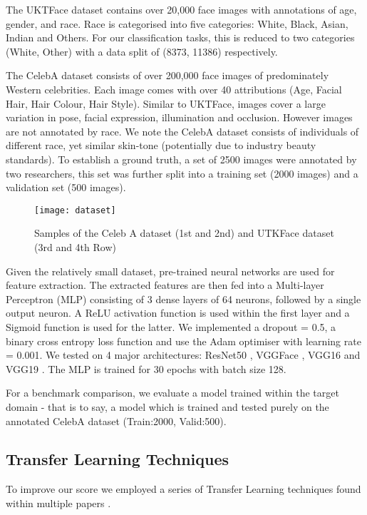 \documentclass[10pt,twocolumn,letterpaper]{article}
\begin{document}
The UKTFace dataset contains over 20,000 face images with annotations of age, gender, and race. Race is categorised into five categories: White, Black, Asian, Indian and Others. For our classification tasks, this is reduced to two categories (White, Other) with a data split of (8373, 11386) respectively. 

The CelebA dataset consists of over 200,000 face images of predominately Western celebrities. Each image comes with over 40 attributions (Age, Facial Hair, Hair Colour, Hair Style). Similar to UKTFace, images cover a large variation in pose, facial expression, illumination and occlusion. However images are not annotated by race. We note the CelebA dataset consists of individuals of different race, yet similar skin-tone (potentially due to industry beauty standards). To establish a ground truth, a set of 2500 images were annotated by two researchers, this set was further split into a training set (2000 images) and a validation set (500 images). 

\begin{figure}[h!]
\label{fig:long}
\begin{center}
   \texttt{[image: dataset]}
\end{center}
   \caption{\label{Fig: Datasets}Samples of the Celeb A dataset (1st and 2nd) and UTKFace dataset (3rd and 4th Row)}


\end{figure}

Given the relatively small dataset, pre-trained neural networks are used for feature extraction. The extracted features are then fed into a Multi-layer Perceptron (MLP) consisting of 3 dense layers of 64 neurons, followed by a single output neuron. A ReLU activation function is used within the first layer and a Sigmoid function is used for the latter. We implemented a dropout = 0.5, a binary cross entropy loss function and use the Adam optimiser with learning rate = 0.001. We tested on 4 major architectures: ResNet50 \cite{He2015}, VGGFace \cite{Parkhi15}, VGG16 and VGG19 \cite{Simonyan14c}. The MLP is trained for 30 epochs with batch size 128. 


For a benchmark comparison, we evaluate a model trained within the target domain - that is to say, a model which is trained and tested purely on the annotated CelebA dataset (Train:2000, Valid:500).  

\subsection{Transfer Learning Techniques}
To improve our score we employed a series of Transfer Learning techniques found within multiple papers \cite{NIPS2012_4824,Razavian_2014_CVPR_Workshops}. 
\end{document}
